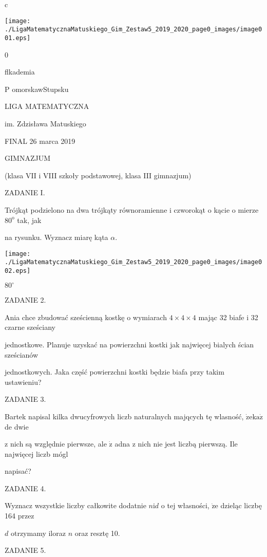 \documentclass[a4paper,12pt]{article}
\begin{document}
c





\begin{center}
\texttt{[image: ./LigaMatematycznaMatuskiego\_Gim\_Zestaw5\_2019\_2020\_page0\_images/image001.eps]}
\end{center}
0

flkademia

P omorskawStupsku

LIGA MATEMATYCZNA

im. Zdzisława Matuskiego

FINAL 26 marca 2019

GIMNAZJUM

(klasa VII i VIII szkoły podstawowej, klasa III gimnazjum)

ZADANIE I.

Trójkąt podzielono na dwa trójkąty równoramienne i czworokąt o kącie o mierze $80^{\mathrm{o}}$ tak, jak

na rysunku. Wyznacz miarę kąta $\alpha.$
\begin{center}
\texttt{[image: ./LigaMatematycznaMatuskiego\_Gim\_Zestaw5\_2019\_2020\_page0\_images/image002.eps]}
\end{center}
$80^{\circ}$

ZADANIE 2.

Ania chce zbudować sześcienną kostkę o wymiarach $4\times 4\times 4$ mając 32 biafe i 32 czarne sześciany

jednostkowe. Planuje uzyskać na powierzchni kostki jak najwięcej bialych ścian sześcianów

jednostkowych. Jaka część powierzchni kostki będzie biafa przy takim ustawieniu?

ZADANIE 3.

Bartek napisal kilka dwucyfrowych liczb naturalnych majqcych tę wlasność, $\dot{\mathrm{z}}\mathrm{e} \mathrm{k}\mathrm{a}\dot{\mathrm{z}}$ de dwie

z nich są względnie pierwsze, ale $\dot{\mathrm{z}}$ adna z nich nie jest liczbą pierwszą. Ile najwięcej liczb mógl

napisać?

ZADANIE 4.

Wyznacz wszystkie liczby całkowite dodatnie $n\mathrm{i}d$ o tej własności, $\dot{\mathrm{z}}\mathrm{e}$ dzieląc liczbę 164 przez

$d$ otrzymamy iloraz $n$ oraz resztę 10.

ZADANIE 5.
\end{document}
